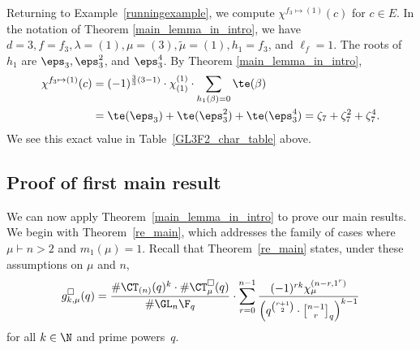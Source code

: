 \begin{example}
Returning to Example~\ref{runningexample}, we compute $\chi^{f_3 \mapsto (1)} (c)$ for $c \in E$.
In the notation of Theorem \ref{main_lemma_in_intro}, we have $d = 3, f = f_3, \lambda = (1), \mu = (3), \tilde{\mu} = (1), h_1 = f_3$, and $\ell_f = 1$.
The roots of $h_1$ are $\eps_3, \eps_3^2$, and $\eps_3^4$.
By Theorem \ref{main_lemma_in_intro},
\begin{align*}
\chi^{f_3 \mapsto (1)} (c)
& =
(-1)^{\frac{3}{3}(3-1)}
\cdot
\chi^{(1)}_{(1)}
\cdot
\sum_{h_1(\beta) = 0} \te(\beta) \\
& = \te(\eps_3) + \te(\eps_3^2) + \te(\eps_3^4)
= \zeta_7 + \zeta_7^2 + \zeta_7^4.
\end{align*}
We see this exact value in Table~\ref{GL3F2_char_table} above.
\end{example}






































































\subsection{Proof of first main result}

We can now apply Theorem~\ref{main_lemma_in_intro} to prove our main results.
We begin with Theorem~\ref{re_main}, which addresses the family of cases where \(\mu \vdash n > 2\) and \(m_1(\mu) = 1\).
Recall that Theorem~\ref{re_main} states, under these assumptions on \(\mu\) and \(n\),
\begin{equation}
g_{k,\mu}^\Box(q)
=
\frac{\# \CT_{(n)} (q)^k
\cdot
\# \CT_\mu^\Box (q)}{\# \GL_n \F_q}
\cdot
\sum_{r=0}^{n-1}
\frac{(-1)^{rk} \chi^{(n-r,1^r)}_\mu}{\left ( q^{\binom{r+1}{2}} \cdot {\genfrac[]{0pt}{1}{n - 1}{r}}_{q} \right )^{k-1}}
\end{equation}
for all \(k \in \N\) and prime powers~\(q\).




